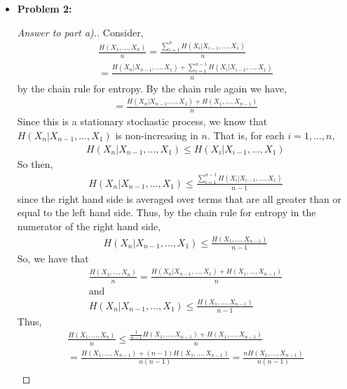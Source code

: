 \documentclass[10pt,twoside]{article}
\begin{document}
\begin{itemize}
    \item\textbf{Problem 2:} \newline
    \noindent\makebox[\linewidth]{\rule{18cm}{0.4pt}}
    \begin{proof}[Answer to part a).]
    Consider, 
    \begin{gather*}
        \frac{H(X_1, \ldots, X_n)}{n} = \frac{\sum_{i=1}^n H(X_i|X_{i-1}, \ldots, X_1)}{n} \\
        = \frac{H(X_n|X_{n-1}, \ldots, X_1) + \sum_{i=1}^{n-1} H(X_{i}|X_{i-1}, \ldots, X_1)}{n}
    \end{gather*}
    by the chain rule for entropy. By the chain rule again we have,
    \begin{gather*}
        = \frac{H(X_n|X_{n-1},\ldots, X_1) + H(X_1, \ldots, X_{n-1})}{n}
    \end{gather*}
    Since this is a stationary stochastic process, we know that $H(X_n|X_{n-1}, \ldots, X_1)$ is non-increasing in $n$. That is, for each $i = 1, \ldots, n$,
    \begin{gather*}
        H(X_n|X_{n-1}, \ldots, X_1) \leq H(X_{i}|X_{i-1
        }, \ldots, X_1)
    \end{gather*}
    So then,
    \begin{gather*}
        H(X_n|X_{n-1}, \ldots, X_1) \leq \frac{\sum_{i=1}^{n-1}H(X_{i}|X_{i-1}, \ldots, X_1)}{n-1}
    \end{gather*}
    since the right hand side is averaged over terms that are all greater than or equal to the left hand side. Thus, by the chain rule for entropy in the numerator of the right hand side,
    \begin{gather*}
        H(X_n|X_{n-1}, \ldots, X_1)\leq \frac{H(X_1, \ldots, X_{n-1})}{n-1}
    \end{gather*}
    So, we have that 
    \begin{gather*}
         \frac{H(X_1, \ldots, X_n)}{n} = \frac{H(X_n|X_{n-1},\ldots, X_1) + H(X_1, \ldots, X_{n-1})}{n} \\
         \text{and} \\
         H(X_n|X_{n-1}, \ldots, X_1) \leq \frac{H(X_1, \ldots, X_{n-1})}{n-1}
    \end{gather*}
    Thus, 
    \begin{gather*}
        \frac{H(X_1, \ldots, X_n)}{n} \leq \frac{\frac{1}{n-1}H(X_1, \ldots, X_{n-1}) + H(X_1, \ldots, X_{n-1})}{n} \\
        = \frac{H(X_1, \ldots, X_{n-1}) + (n-1)H(X_1, \ldots, X_{n-1})}{n(n-1)} = \frac{nH(X_1, \ldots, X_{n-1})}{n(n-1)} \\

\end{gather*}
\end{proof}
\end{itemize}
\end{document}
